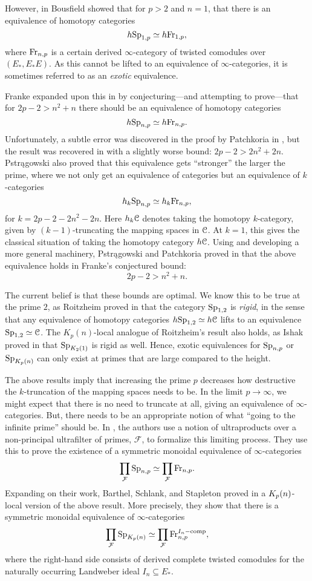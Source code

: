 However, in \cite{bousfield_1985} Bousfield showed that for $p>2$ and $n=1$, that there is an equivalence of homotopy categories
\[h \mathrm{Sp}_{1,p}\simeq h \mathrm{Fr}_{1,p},\]
where $\mathrm{Fr}_{n,p}$ is a certain derived $\infty$-category of twisted comodules over $(E_*, E_*E)$. As this cannot be lifted to an equivalence of $\infty$-categories, it is sometimes referred to as an \emph{exotic} equivalence. 

Franke expanded upon this in \cite{franke_96} by conjecturing---and attempting to prove---that for $2p-2 > n^2+n$ there should be an equivalence of homotopy categories
\[h \mathrm{Sp}_{n,p}\simeq h \mathrm{Fr}_{n,p}.\]
Unfortunately, a subtle error was discovered in the proof by Patchkoria in \cite{patchkoria_2013}, but the result was recovered in \cite{pstragowski_2021} with a slightly worse bound: $2p-2>2n^2+2n$. Pstr{\k a}gowski also proved that this equivalence gets ``stronger'' the larger the prime, where we not only get an equivalence of categories but an equivalence of $k$-categories 
\[h_k \mathrm{Sp}_{n,p}\simeq h_k \mathrm{Fr}_{n,p},\]
for $k=2p-2-2n^2-2n$. Here $h_k \EuScript{C}$ denotes taking the homotopy $k$-category, given by $(k-1)$-truncating the mapping spaces in $\EuScript{C}$. At $k=1$, this gives the classical situation of taking the homotopy category $h\EuScript{C}$. Using and developing a more general machinery, Pstr{\k a}gowski and Patchkoria proved in \cite{patchkoria-pstragowski_2021} that the above equivalence holds in Franke's conjectured bound:
\[2p-2>n^2+n.\] 

The current belief is that these bounds are optimal. We know this to be true at the prime $2$, as Roitzheim proved in \cite{roitzheim_07} that the category $\mathrm{Sp}_{1,2}$ is \emph{rigid}, in the sense that any equivalence of homotopy categories $h\mathrm{Sp}_{1,2} \simeq h\EuScript{C}$ lifts to an equivalence $\mathrm{Sp}_{1,2}\simeq \EuScript{C}$. The $K_p(n)$-local analogue of Roitzheim's result also holds, as Ishak proved in \cite{ishak_19} that $\mathrm{Sp}_{K_2(1)}$ is rigid as well. Hence, exotic equivalences for $\mathrm{Sp}_{n,p}$ or $\mathrm{Sp}_{{K_p(n)}}$ can only exist at primes that are large compared to the height. 

The above results imply that increasing the prime $p$ decreases how destructive the $k$-truncation of the mapping spaces needs to be. In the limit $p\rightarrow \infty$, we might expect that there is no need to truncate at all, giving an equivalence of $\infty$-categories. But, there needs to be an appropriate notion of what ``going to the infinite prime'' should be. In \cite{barthel-schlank-stapleton_2020}, the authors use a notion of ultraproducts over a non-principal ultrafilter of primes, $\mathcal{F}$, to formalize this limiting process. They use this to prove the existence of a symmetric monoidal equivalence of $\infty$-categories
\[\prod_{\mathcal{F}}\mathrm{Sp}_{n,p} \simeq \prod_{\mathcal{F}}\mathrm{Fr}_{n,p}.\] 
Expanding on their work, Barthel, Schlank, and Stapleton proved in \cite{barthel-schlank-stapleton_2021} a ${K_p(n)}$-local version of the above result. More precisely, they show that there is a symmetric monoidal equivalence of $\infty$-categories
\[\prod_{\mathcal{F}}\mathrm{Sp}_{{K_p(n)}} \simeq \prod_{\mathcal{F}}\mathrm{Fr}_{n,p}^{I_n-\mathrm{comp}},\]
where the right-hand side consists of derived complete twisted comodules for the naturally occurring Landweber ideal $I_n\subseteq E_*$. 


